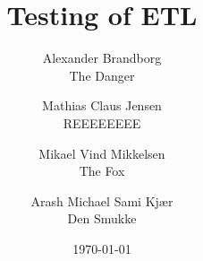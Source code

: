 

\title{Testing of ETL}
\author{Alexander Brandborg
             \\ The Danger
        \and Mathias Claus Jensen
             \\ REEEEEEEE
        \and Mikael Vind Mikkelsen
             \\ The Fox
        \and Arash Michael Sami Kjær
             \\ Den Smukke
        }
\date{\today}


\maketitle












